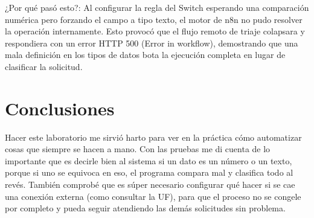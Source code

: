 \documentclass[11pt,letterpaper]{article}
\begin{document}
¿Por qué pasó esto?: Al configurar la regla del Switch esperando una comparación numérica pero forzando el campo a tipo texto, el motor de n8n no pudo resolver la operación internamente. Esto provocó que el flujo remoto de triaje colapsara y respondiera con un error HTTP 500 (Error in workflow), demostrando que una mala definición en los tipos de datos bota la ejecución completa en lugar de clasificar la solicitud.

\section{Conclusiones}

Hacer este laboratorio me sirvió harto para ver en la práctica cómo automatizar cosas que siempre se hacen a mano. Con las pruebas me di cuenta de lo importante que es decirle bien al sistema si un dato es un número o un texto, porque si uno se equivoca en eso, el programa compara mal y clasifica todo al revés. También comprobé que es súper necesario configurar qué hacer si se cae una conexión externa (como consultar la UF), para que el proceso no se congele por completo y pueda seguir atendiendo las demás solicitudes sin problema.
\end{document}
